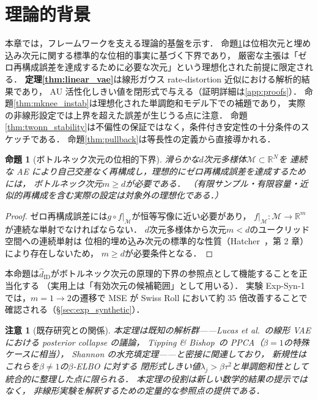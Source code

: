 \documentclass[11pt,a4paper]{jsarticle}
\newtheorem{proposition}{命題}
\newtheorem{remark}{注意}
\newcommand{\R}{\mathbb{R}}
\begin{document}
\section{理論的背景}\label{sec:theory}

本章では，フレームワークを支える理論的基盤を示す．
命題\ref{thm:lower_bound}は位相次元と埋め込み次元に関する標準的な位相的事実に基づく下界であり，
厳密な主張は「ゼロ再構成誤差を達成するために必要な次元」という理想化された前提に限定される．
\textbf{定理\ref{thm:linear_vae}}は線形ガウス rate-distortion 近似における解析的結果であり，
AU 活性化しきい値を閉形式で与える（証明詳細は\ref{app:proofs}）．
命題\ref{thm:mknee_instab}は理想化された単調飽和モデル下での補題であり，
実際の非線形設定では上界を超えた誤差が生じうる点に注意．
命題\ref{thm:twonn_stability}は不偏性の保証ではなく，条件付き安定性の十分条件のスケッチである．
命題\ref{thm:pullback}は等長性の定義から直接導かれる．

\begin{proposition}[ボトルネック次元の位相的下界]\label{thm:lower_bound}
滑らかな$d$次元多様体$\mathcal{M} \subset \R^N$を
連続な AE により自己交差なく再構成し，理想的にゼロ再構成誤差を達成するためには，
ボトルネック次元$m \geq d$が必要である．
（有限サンプル・有限容量・近似的再構成を含む実際の設定は対象外の理想化である．）
\end{proposition}

\begin{proof}
ゼロ再構成誤差には$g \circ f|_\mathcal{M}$が恒等写像に近い必要があり，
$f|_\mathcal{M}: \mathcal{M} \to \R^m$が連続な単射でなければならない．
$d$次元多様体から次元$m < d$のユークリッド空間への連続単射は
位相的埋め込み次元の標準的な性質（Hatcher~\cite{hatcher2002algebraic}，第 2 章）により存在しないため，
$m \geq d$が必要条件となる．
\end{proof}

本命題は$\hat{d}_\mathrm{ID}$がボトルネック次元の原理的下界の参照点として機能することを正当化する
（実用上は「有効次元の候補範囲」として用いる）．
実験 Exp-Syn-1 では，$m = 1 \to 2$の遷移で MSE が Swiss Roll において約 35 倍改善することで確認される（§\ref{sec:exp_synthetic}）．

\begin{remark}[既存研究との関係]
本定理は既知の解析群——Lucas et al.~\cite{lucas2019elbo}の線形 VAE における posterior collapse の議論，
Tipping \& Bishop~\cite{tippingbishop1999ppca}の PPCA（$\beta = 1$の特殊ケースに相当），
Shannon の水充填定理\cite{cover2006elements}——と密接に関連しており，
新規性はこれらを$\beta \neq 1$の$\beta$-ELBO に対する
閉形式しきい値$\lambda_j > \beta\tau^2$と単調飽和性として統合的に整理した点に限られる．
本定理の役割は新しい数学的結果の提示ではなく，
非線形実験を解釈するための定量的な参照点の提供である．
\end{remark}
\end{document}

